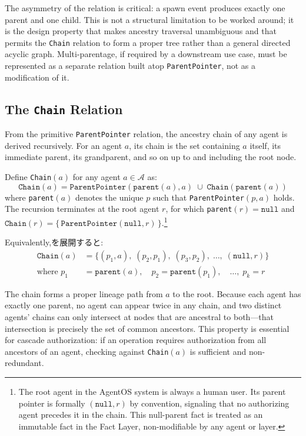 The asymmetry of the relation is critical: a spawn event produces exactly one parent and one child. This is not a structural limitation to be worked around; it is the design property that makes ancestry traversal unambiguous and that permits the \texttt{Chain} relation to form a proper tree rather than a general directed acyclic graph. Multi-parentage, if required by a downstream use case, must be represented as a separate relation built atop \texttt{ParentPointer}, not as a modification of it.

\subsection{The \texttt{Chain} Relation}

From the primitive \texttt{ParentPointer} relation, the ancestry chain of any agent is derived recursively. For an agent $a$, its chain is the set containing $a$ itself, its immediate parent, its grandparent, and so on up to and including the root node.

\begin{definition}
Define \texttt{Chain}$(a)$ for any agent $a \in \mathcal{A}$ as:
\begin{equation}
\texttt{Chain}(a) = \texttt{ParentPointer}(\texttt{parent}(a), a) \; \cup \; \texttt{Chain}(\texttt{parent}(a))
\end{equation}
where \texttt{parent}$(a)$ denotes the unique $p$ such that \texttt{ParentPointer}$(p, a)$ holds. The recursion terminates at the root agent $r$, for which \texttt{parent}$(r) = \texttt{null}$ and $\texttt{Chain}(r) = \{\,\texttt{ParentPointer}(\texttt{null}, r)\,\}$.\footnote{The root agent in the AgentOS system is always a human user. Its parent pointer is formally $(\texttt{null}, r)$ by convention, signaling that no authorizing agent precedes it in the chain. This null-parent fact is treated as an immutable fact in the Fact Layer, non-modifiable by any agent or layer.}
\end{definition}

Equivalently,を展開すると:
\begin{align}
\texttt{Chain}(a) &= \{(p_1, a),\; (p_2, p_1),\; (p_3, p_2),\; \ldots,\; (\texttt{null}, r)\} \\
\text{where } p_1 &= \texttt{parent}(a),\quad p_2 = \texttt{parent}(p_1),\quad \ldots,\; p_k = r
\end{align}

The chain forms a proper lineage path from $a$ to the root. Because each agent has exactly one parent, no agent can appear twice in any chain, and two distinct agents' chains can only intersect at nodes that are ancestral to both—that intersection is precisely the set of common ancestors. This property is essential for cascade authorization: if an operation requires authorization from all ancestors of an agent, checking against \texttt{Chain}$(a)$ is sufficient and non-redundant.

